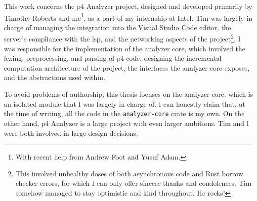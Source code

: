 This work concerns the \acrshort{p4} Analyzer project, designed and developed
primarily by Timothy Roberts and me\footnote{With recent help from Andrew Foot
and Yusuf Adam.}, as a part of my internship at Intel. Tim was largely in charge
of managing the integration into the Visual Studio Code editor, the server's
compliance with the \acrlong{lsp}, and the networking aspects of the
project\footnote{This involved unhealthy doses of both asynchronous code and
Rust borrow checker errors, for which I can only offer sincere thanks and
condolences. Tim somehow managed to stay optimistic and kind throughout. He
rocks!}. I was responsible for the implementation of the analyzer core, which
involved the lexing, preprocessing, and parsing of \acrshort{p4} code, designing
the incremental computation architecture of the project, the interfaces the
analyzer core exposes, and the abstractions used within.

To avoid problems of authorship, this thesis focuses on the analyzer core, which
is an isolated module that I was largely in charge of. I can honestly claim
that, at the time of writing, all the code in the \texttt{analyzer-core} crate
is my own. On the other hand, \acrshort{p4} Analyzer is a large project with
even larger ambitions. Tim and I were both involved in large design decisions.
